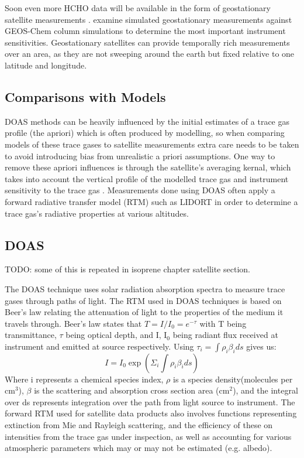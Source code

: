     Soon even more HCHO data will be available in the form of geostationary satellite measurements \citep{Kwon2017}.
    \cite{Kwon2017} examine simulated geostationary measurements against GEOS-Chem column simulations to determine the most important instrument sensitivities.
    Geostationary satellites can provide temporally rich measurements over an area, as they are not sweeping around the earth but fixed relative to one latitude and longitude.
    
  \subsection{Comparisons with Models}
  
    DOAS methods can be heavily influenced by the initial estimates of a trace gas profile (the apriori) which is often produced by modelling, so when comparing models of these trace gases to satellite measurements extra care needs to be taken to avoid introducing bias from unrealistic a priori assumptions.
    One way to remove these apriori influences is through the satellite's averaging kernal, which takes into account the vertical profile of the modelled trace gas and instrument sensitivity to the trace gas \citep{Eskes2003, Palmer2001}.
    Measurements done using DOAS often apply a forward radiative transfer model (RTM) such as LIDORT in order to determine a trace gas's radiative properties at various altitudes.
  
  \subsection{DOAS}
    TODO: some of this is repeated in isoprene chapter satellite section.
    
    The DOAS technique uses solar radiation absorption spectra to measure trace gases through paths of light.
    The RTM used in DOAS techniques is based on Beer's law relating the attenuation of light to the properties of the medium it travels through.
    Beer's law states that $ T = I/I_0 = e^{-\tau} $ with T being transmittance, $\tau$ being optical depth, and I, I$_0$ being radiant flux received at instrument and emitted at source respectively.
    Using 
    $ \tau_i = \int \rho_i \beta_i ds $ gives us:
    $$ I = I_0 \exp {\left( \Sigma_i \int \rho_i \beta_i ds \right) } $$
    Where i represents a chemical species index, $\rho$ is a species density(molecules per cm$^3$), $\beta$ is the scattering and absorption cross section area (cm$^2$), and the integral over ds represents integration over the path from light source to instrument.
    The forward RTM used for satellite data products also involves functions representing extinction from Mie and Rayleigh scattering, and the efficiency of these on intensities from the trace gas under inspection, as well as accounting for various atmospheric parameters which may or may not be estimated (e.g. albedo).
    
